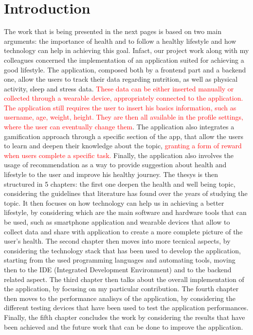 \section*{Introduction}
The work that is being presented in the next pages is based on two main arguments: the importance of health and to follow a healthy lifestyle and how technology can help in achieving this goal. Infact, our project work along with my colleagues concerned the implementation of an application suited for achieving a good lifestyle. The application, composed both by a frontend part and a backend one, allow the users to track their data regarding nutrition, as well as physical activity, sleep and stress data. \textcolor{red}{These data can be either inserted manually or collected through a wearable device, appropriately connected to the application. The application still requires the user to insert his basics information, such as username, age, weight, height. They are then all available in the profile settings, where the user can eventually change them}. The application also integrates a gamification approach through a specific section of the app, that allow the users to learn and deepen their knowledge about the topic, \textcolor{red}{granting a form of reward when users complete a specific task.} Finally, the application also involves the usage of recommendation as a way to provide suggestion about health and lifestyle to the user and improve his healthy journey. The thesys is then structured in 5 chapters: the first one deepen the health and well being topic, considering the guidelines that literature has found over the years of studying the topic. It then focuses on how technology can help us in achieving a better lifestyle, by considering which are the main software and hardware tools that can be used, such as smartphone application and wearable devices that allow to collect data and share with application to create a more complete picture of the user's health. The second chapter then moves into more tecnical aspects, by considering the technology stack that has been used to develop the application, starting from the used programming languages and automating tools, moving then to the IDE (Integrated Development Environment) and to the backend related aspect. The third chapter then talks about the overall implementation of the application, by focusing on my particular contribution. The fourth chapter then moves to the performance analisys of the application, by considering the different testing devices that have been used to test the application performances. Finally, the fifth chapter concludes the work by considering the results that have been achieved and the future work that can be done to improve the application.
\newline
\newline
\newline
\newline
\newline
\newline
\newline
\newline

